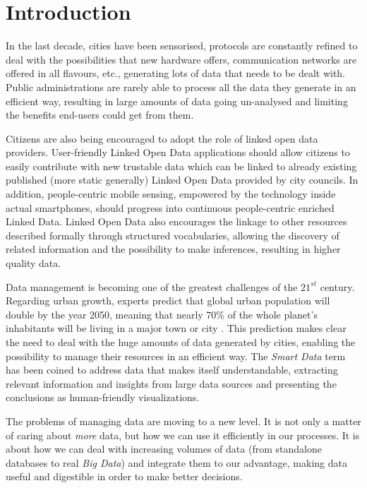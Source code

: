 \section{Introduction}
\label{sec:introduction}

In the last decade, cities have been sensorised, protocols are constantly refined to deal with the possibilities that new hardware offers, communication networks are offered in all flavours, etc., generating lots of data that needs to be dealt with. Public administrations are rarely able to process all the data they generate in an efficient way, resulting in large amounts of data going un-analysed and limiting the benefits end-users could get from them.

Citizens are also being encouraged to adopt the role of linked open data providers. User-friendly Linked Open Data applications should allow citizens to easily contribute with new trustable data which can be linked to already existing published (more static generally) Linked Open Data provided by city councils. In addition, people-centric mobile sensing, empowered by the technology inside actual smartphones, should progress into continuous people-centric enriched Linked Data. Linked Open Data also encourages the linkage to other resources described formally through structured vocabularies, allowing the discovery of related information and the possibility to make inferences, resulting in higher quality data.

Data management is becoming one of the greatest challenges of the $21^{st}$ century. Regarding urban growth, experts predict that global urban population will double by the year 2050, meaning that nearly 70\% of the whole planet's inhabitants will be living in a major town or city \cite{city2010urbanization}. This prediction makes clear the need to deal with the huge amounts of data generated by cities, enabling the possibility to manage their resources in an efficient way. The \textit{Smart Data} term has been coined to address data that makes itself understandable, extracting relevant information and insights from large data sources and presenting the conclusions as human-friendly visualizations.

The problems of managing data are moving to a new level. It is not only a matter of caring about \textit{more} data, but how we can use it efficiently in our processes. It is about how we can deal with increasing volumes of data (from standalone databases to real \textit{Big Data}) and integrate them to our advantage, making data useful and digestible in order to make better decisions.

